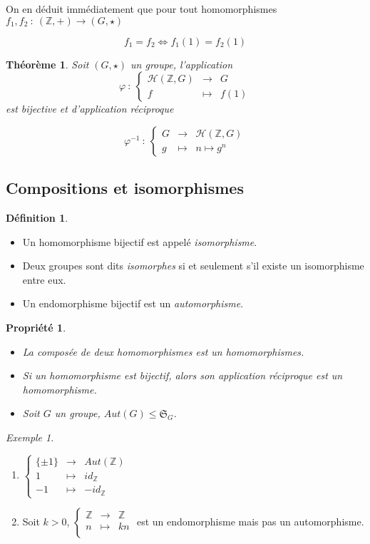 \documentclass[]{article}
\newtheorem{mythm}{Théorème}
\newtheorem{myproperty}{Propriété}
\theoremstyle{remark}
\newtheorem{myexmpl}{Exemple}
\theoremstyle{definition}
\newtheorem{mydef}{Définition}
\newcommand{\func}[5]{
#1 ~ : ~ \left\{ \begin{array}{lcl}
	#2 & \longrightarrow & #3 \\
	#4 & \longmapsto & #5
\end{array}
\right.
}
\newcommand{\funcshort}[3]{
#1 ~ : ~ #2 \longrightarrow #3
}
\begin{document}
On en déduit immédiatement que pour tout homomorphismes $\funcshort{f_1, f_2}{(\mathbb{Z}, +)}{(G, \star)}$

$$f_1=f_2 \Longleftrightarrow f_1(1)=f_2(1)$$

\begin{mythm}
	Soit $(G, \star)$ un groupe, l'application
	$$
	\func{\varphi}{\mathcal{H}(\mathbb{Z}, G)}{G}{f}{f(1)}
	$$
	est bijective et d'application réciproque
	
	$$
	\func{\varphi^{-1}}{G}{\mathcal{H}(\mathbb{Z}, G)}{g}{n \longmapsto g^n}
	$$
\end{mythm}

\subsection{Compositions et isomorphismes}

\begin{mydef}
	\leavevmode
	\begin{itemize}
		\item Un homomorphisme bijectif est appelé \textit{isomorphisme}.
		\item Deux groupes sont dits \textit{isomorphes} si et seulement s'il existe un isomorphisme entre eux.
		\item Un endomorphisme bijectif est un \textit{automorphisme}.
	\end{itemize}
\end{mydef}

\begin{myproperty}
	\leavevmode
	\begin{itemize}
		\item La composée de deux homomorphismes est un homomorphismes.
		\item Si un homomorphisme est bijectif, alors son application réciproque est un homomorphisme.
		\item Soit $G$ un groupe, $Aut(G) \leqslant \mathfrak{S}_G$.
	\end{itemize}
\end{myproperty}

\begin{myexmpl}
	\leavevmode
	\begin{enumerate}
		\item
		$\left\{\begin{array}{rcl}
			\{\pm 1\} & \longrightarrow & Aut(\mathbb{Z}) \\
			1 & \longmapsto & id_{\mathbb{Z}} \\
			-1 & \longmapsto & -id_{\mathbb{Z}}
		\end{array}\right.$
	
	\item Soit $k > 0$, 
		$\left\{\begin{array}{rcl}
			\mathbb{Z} & \longrightarrow & \mathbb{Z} \\
			n & \longmapsto & kn \\
		\end{array}\right.$ est un endomorphisme mais pas un automorphisme.
	\end{enumerate}
\end{myexmpl}
\end{document}
